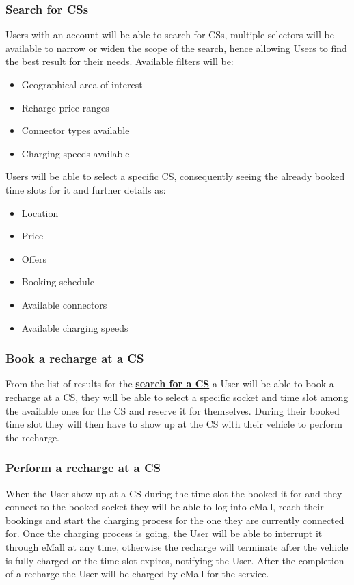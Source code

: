 \documentclass[11pt]{article}
\begin{document}
\subsubsection{Search for CSs}
\label{subsubsection:searchForCS}

Users with an account will be able to search for CSs, multiple selectors will be available to narrow or widen the scope of the search, hence allowing Users to find the best result for their needs. Available filters will be:
\begin{itemize}
    \item Geographical area of interest
    \item Reharge price ranges
    \item Connector types available
    \item Charging speeds available
\end{itemize}
Users will be able to select a specific CS, consequently seeing the already booked time slots for it and further details as:
\begin{itemize}
    \item Location
    \item Price
    \item Offers
    \item Booking schedule
    \item Available connectors
    \item Available charging speeds
\end{itemize}

\subsubsection{Book a recharge at a CS}

From the list of results for the \hyperref[subsubsection:searchForCS]{\textbf{search for a CS}} a User will be able to book a recharge at a CS, they will be able to select a specific socket and time slot among the available ones for the CS and reserve it for themselves. During their booked time slot they will then have to show up at the CS with their vehicle to perform the recharge.

\subsubsection{Perform a recharge at a CS}

When the User show up at a CS during the time slot the booked it for and they connect to the booked socket they will be able to log into eMall, reach their bookings and start the charging process for the one they are currently connected for. Once the charging process is going, the User will be able to interrupt it through eMall at any time, otherwise the recharge will terminate after the vehicle is fully charged or the time slot expires, notifying the User. After the completion of a recharge the User will be charged by eMall for the service.
\end{document}
